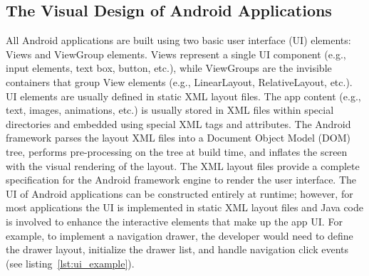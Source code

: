 \subsection{The Visual Design of Android Applications}
All Android applications are built using two basic user interface (UI) elements: Views and ViewGroup elements.
Views represent a single UI component (e.g., input elements, text box, button, etc.), while ViewGroups are the invisible containers that group View elements (e.g., LinearLayout, RelativeLayout, etc.).
UI elements are usually defined in static XML layout files. The app content (e.g., text, images, animations, etc.) is usually stored in XML files within special directories and embedded using special XML tags and attributes.
The Android framework parses the layout XML files into a Document Object Model (DOM) tree, performs pre-processing on the tree at build time, and inflates the screen with the visual rendering of the layout.
The XML layout files provide a complete specification for the Android framework engine to render the user interface.
The UI of Android applications can be constructed entirely at runtime; however, for most applications the UI is implemented in static XML layout files and Java code is involved to enhance the interactive elements that make up the app UI.
For example, to implement a navigation drawer, the developer would need to define the drawer layout, initialize the drawer list, and handle navigation click events (see listing~\ref{lst:ui_example}).

